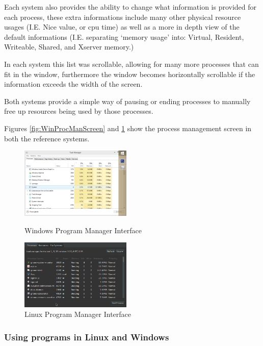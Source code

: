 \documentclass[a4paper]{report}
\begin{document}
Each system also provides the ability to change what information is provided for each process, these extra informations include many other physical resource usages (I.E. Nice value, or cpu time) as well as a more in depth view of the default informations (I.E. separating `memory usage' into: Virtual, Resident, Writeable, Shared, and Xserver memory.)

In each system this list was scrollable, allowing for many more processes that can fit in the window, furthermore the window becomes horizontally scrollable if the information exceeds the width of the screen.

Both systems provide a simple way of pausing or ending processes to manually free up resources being used by those processes.

Figures \ref{fig:WinProcManScreen} and \ref{fig:LinProcManScreen} show the process management screen in both the reference systems.

\begin{figure}[ht]
\centering
\begin{minipage}{.5\textwidth}
  \centering
  \includegraphics[width=200px]{images/Windows_Program_Manager_Screenshot}
  \caption{Windows Program Manager Interface}
  \label{fig:WinProcManScreen}
\end{minipage}%
\begin{minipage}{.5\textwidth}
  \centering
  \includegraphics[width=200px]{images/Linux_Program_Manager_Screenshot}
  \caption{Linux Program Manager Interface}
  \label{fig:LinProcManScreen}
\end{minipage} 
\end{figure}


\subsubsection*{Using programs in Linux and Windows}
\end{document}
